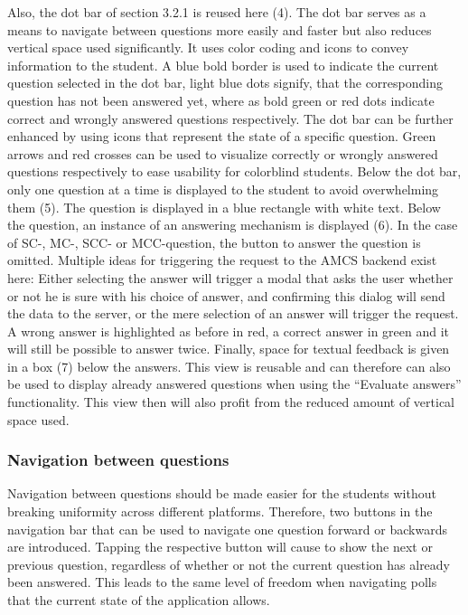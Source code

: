 Also, the dot bar of section 3.2.1 is reused here (4). The dot bar serves as a means to navigate between questions more easily and faster but also reduces vertical space used significantly. It uses color coding and icons to convey information to the student. A blue bold border is used to indicate the current question selected in the dot bar, light blue dots signify, that the corresponding question has not been answered yet, where as bold green  or red dots indicate correct and wrongly answered questions respectively. The dot bar can be further enhanced by using icons that represent the state of a specific question. Green arrows and red crosses can be used to visualize correctly or wrongly answered questions respectively to ease usability for colorblind students. Below the dot bar, only one question at a time is displayed to the student to avoid overwhelming them (5). The question is displayed in a blue rectangle with white text. Below the question, an instance of an answering mechanism is displayed (6). In the case of SC-, MC-, SCC- or MCC-question, the button to answer the question is omitted. Multiple ideas for triggering the request to the AMCS backend exist here: Either selecting the answer will trigger a modal that asks the user whether or not he is sure with his choice of answer, and confirming this dialog will send the data to the server, or the mere selection of an answer will trigger the request.  A wrong answer is highlighted as before in red, a correct answer in green and it will still be possible to answer twice. Finally, space for textual feedback is given in a box (7) below the answers. This view is reusable and can therefore can also be used to display already answered questions when using the “Evaluate answers” functionality. This view then will also profit from the reduced amount of vertical space used. 

\subsubsection{Navigation between questions}

Navigation between questions should be made easier for the students without breaking uniformity across different platforms. Therefore, two buttons in the navigation bar that can be used to navigate one question forward or backwards are introduced. Tapping the respective button will cause to show the next or previous question, regardless of whether or not the current question has already been answered. This leads to the same level of freedom when navigating polls that the current state of the application allows.

